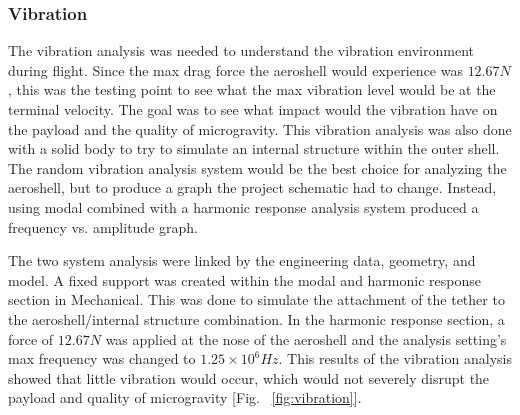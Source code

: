 \begin{table}[H]
\caption{\label{tab:temptable}Maximum temperature values on aeroshell from 0 – 25 seconds.}
\centering
{}
\end{table}

\subsubsection*{Vibration}
\indent\indent The vibration analysis was needed to understand the vibration environment during flight. Since the max drag force the aeroshell would experience was $12.67 N$, this was the testing point to see what the max vibration level would be at the terminal velocity. The goal was to see what impact would the vibration have on the payload and the quality of microgravity. This vibration analysis was also done with a solid body to try to simulate an internal structure within the outer shell. The random vibration analysis system would be the best choice for analyzing the aeroshell, but to produce a graph the project schematic had to change. Instead, using modal combined with a harmonic response analysis system produced a frequency vs. amplitude graph.

\indent\indent The two system analysis were linked by the engineering data, geometry, and model. A fixed support was created within the modal and harmonic response section in Mechanical. This was done to simulate the attachment of the tether to the aeroshell/internal structure combination. In the harmonic response section, a force of $12.67 N$ was applied at the nose of the aeroshell and the analysis setting’s max frequency was changed to $1.25 \times 10^6Hz$. This results of the vibration analysis showed that little vibration would occur, which would not severely disrupt the payload and quality of microgravity [Fig. ~\ref{fig:vibration}].

